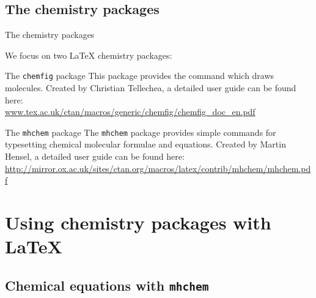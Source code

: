 \documentclass{beamer}
\begin{document}
\subsection{The chemistry packages}
\begin{frame}{The chemistry packages}

We focus on two \LaTeX{} chemistry packages:
\begin{block}{The \texttt{chemfig} package}
This package provides the command which draws molecules. Created by Christian Tellechea, a detailed user guide can be found here:\\[0.4cm]
\small{\url{www.tex.ac.uk/ctan/macros/generic/chemfig/chemfig_doc_en.pdf}}
\end{block}
\begin{block}{The \texttt{mhchem} package}
The \texttt{mhchem} package provides simple commands for typesetting chemical molecular formulae and equations. Created by Martin Hensel, a detailed user guide can be found here:\\[0.4cm]
\small{\url{http://mirror.ox.ac.uk/sites/ctan.org/macros/latex/contrib/mhchem/mhchem.pdf}}
\end{block}

\end{frame}

\section{Using chemistry packages with \LaTeX{}}

\subsection{Chemical equations with \texttt{mhchem}}
\end{document}
